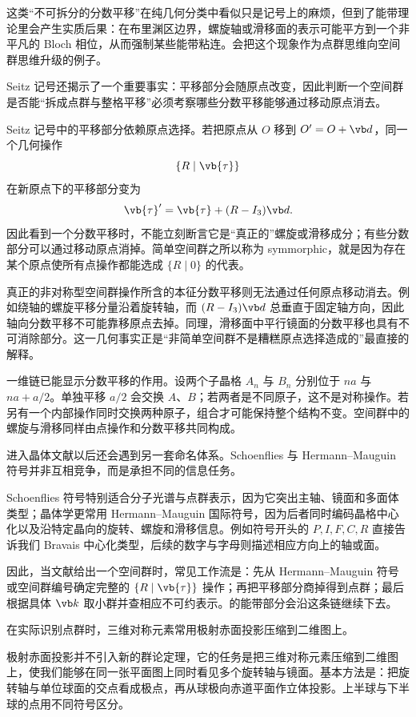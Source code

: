 这类“不可拆分的分数平移”在纯几何分类中看似只是记号上的麻烦，但到了能带理论里会产生实质后果：在布里渊区边界，螺旋轴或滑移面的表示可能平方到一个非平凡的 Bloch 相位，从而强制某些能带粘连。会把这个现象作为点群思维向空间群思维升级的例子。

Seitz 记号还揭示了一个重要事实：平移部分会随原点改变，因此判断一个空间群是否能“拆成点群与整格平移”必须考察哪些分数平移能够通过移动原点消去。

Seitz 记号中的平移部分依赖原点选择。若把原点从 $O$ 移到 $O'=O+\vb d$，同一个几何操作
\[
\{R\mid\vb{\tau}\}
\]
在新原点下的平移部分变为
\[
\vb{\tau}'
=\vb{\tau}+(R-I_3)\vb d.
\label{eq:origin-shift-seitz}
\]
因此看到一个分数平移时，不能立刻断言它是“真正的”螺旋或滑移成分；有些分数部分可以通过移动原点消掉。简单空间群之所以称为 symmorphic，就是因为存在某个原点使所有点操作都能选成 $\{R\mid0\}$ 的代表。

真正的非对称型空间群操作所含的本征分数平移则无法通过任何原点移动消去。例如绕轴的螺旋平移分量沿着旋转轴，而 $(R-I_3)\vb d$ 总垂直于固定轴方向，因此轴向分数平移不可能靠移原点去掉。同理，滑移面中平行镜面的分数平移也具有不可消除部分。这一几何事实正是“非简单空间群不是糟糕原点选择造成的”最直接的解释。

一维链已能显示分数平移的作用。设两个子晶格 $A_n$ 与 $B_n$ 分别位于 $na$ 与 $na+a/2$。单独平移 $a/2$ 会交换 $A$、$B$；若两者是不同原子，这不是对称操作。若另有一个内部操作同时交换两种原子，组合才可能保持整个结构不变。空间群中的螺旋与滑移同样由点操作和分数平移共同构成。


进入晶体文献以后还会遇到另一套命名体系。Schoenflies 与 Hermann--Mauguin 符号并非互相竞争，而是承担不同的信息任务。

Schoenflies 符号特别适合分子光谱与点群表示，因为它突出主轴、镜面和多面体类型；晶体学更常用 Hermann--Mauguin 国际符号，因为后者同时编码晶格中心化以及沿特定晶向的旋转、螺旋和滑移信息。例如符号开头的 $P,I,F,C,R$ 直接告诉我们 Bravais 中心化类型，后续的数字与字母则描述相应方向上的轴或面。

因此，当文献给出一个空间群时，常见工作流是：先从 Hermann--Mauguin 符号或空间群编号确定完整的 $\{R\mid\vb{\tau}\}$ 操作；再把平移部分商掉得到点群；最后根据具体 $\vb k$ 取小群并查相应不可约表示。的能带部分会沿这条链继续下去。

在实际识别点群时，三维对称元素常用极射赤面投影压缩到二维图上。

极射赤面投影并不引入新的群论定理，它的任务是把三维对称元素压缩到二维图上，使我们能够在同一张平面图上同时看见多个旋转轴与镜面。基本方法是：把旋转轴与单位球面的交点看成极点，再从球极向赤道平面作立体投影。上半球与下半球的点用不同符号区分。

